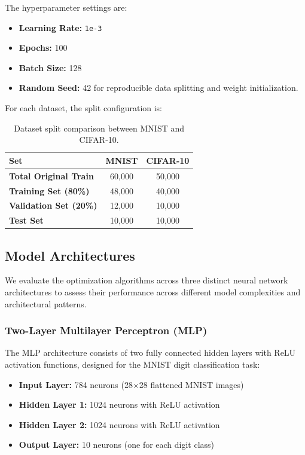 \documentclass[12pt]{article}
\begin{document}
The hyperparameter settings are:
\begin{itemize}
    \item \textbf{Learning Rate:} \texttt{1e-3}
    \item \textbf{Epochs:} 100
    \item \textbf{Batch Size:} 128
    \item \textbf{Random Seed:} 42 for reproducible data splitting and weight initialization.
\end{itemize}

For each dataset, the split configuration is:
\begin{table}[H]
\centering
\begin{tabular}{lcc}
\toprule
\textbf{Set} & \textbf{MNIST} & \textbf{CIFAR-10} \\
\midrule
\textbf{Total Original Train} & 60,000 & 50,000 \\
\textbf{Training Set (80\%)} & 48,000 & 40,000 \\
\textbf{Validation Set (20\%)} & 12,000 & 10,000 \\
\textbf{Test Set} & 10,000 & 10,000 \\
\bottomrule
\end{tabular}
\caption{Dataset split comparison between MNIST and CIFAR-10.}
\label{tab:dataset-split-vertical}
\end{table}

\subsection{Model Architectures}

We evaluate the optimization algorithms across three distinct neural network architectures to assess their performance across different model complexities and architectural patterns.

\subsubsection{Two-Layer Multilayer Perceptron (MLP)}

The MLP architecture consists of two fully connected hidden layers with ReLU activation functions, designed for the MNIST digit classification task:

\begin{itemize}
    \item \textbf{Input Layer:} 784 neurons (28×28 flattened MNIST images)
    \item \textbf{Hidden Layer 1:} 1024 neurons with ReLU activation
    \item \textbf{Hidden Layer 2:} 1024 neurons with ReLU activation  
    \item \textbf{Output Layer:} 10 neurons (one for each digit class)
\end{itemize}
\end{document}
